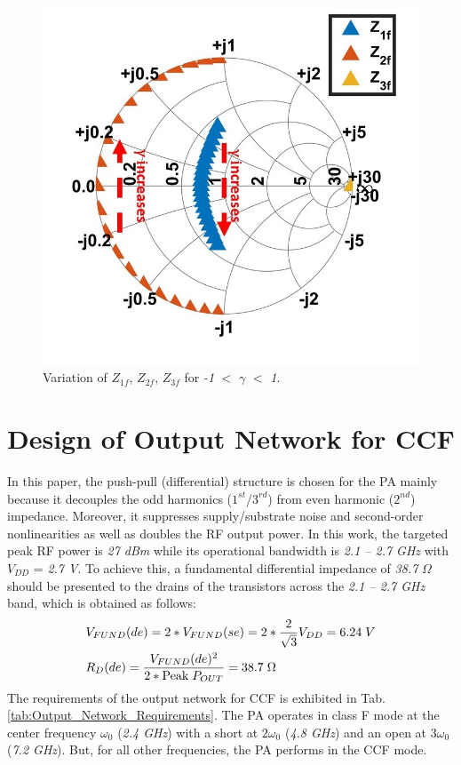 \documentclass[conference]{IEEEtran}
\begin{document}
\begin{figure}[!t]
\centering
\captionsetup{font=footnotesize}
\includegraphics[width=0.63\linewidth]{Images/CCF/CCF_SC.jpg}
\caption{Variation of $Z_{1f}$, $Z_{2f}$, $Z_{3f}$ for \textit{-1} $<$ $\gamma$ $<$ \textit{1}.}
\label{fig:CCF_SC}
\vspace{-0.05in}
\end{figure}
 

\section{Design of Output Network for CCF}
\label{section:ON}
In this paper, the \color{blue} push-pull (differential) \color{black} structure is chosen for the PA mainly because it \color{blue} decouples the odd harmonics ($1^{st}$/$3^{rd}$) from even harmonic ($2^{nd}$) impedance. \color{black} Moreover, it \color{blue} suppresses supply/substrate noise \color{black} and second-order nonlinearities as well as \color{blue} doubles the RF \color{black} output power. 
\color{blue} In this work, the targeted peak RF power is \textit{27 dBm}  while its operational bandwidth is \textit{2.1 -- 2.7 GHz} with $V_{DD}$ = \textit{2.7 V}. To \color{black} achieve this, a \color{blue} fundamental \color{black} differential impedance of \textit{38.7} $\Omega$ should be presented to the drains of the transistors across the  \color{blue}  \textit{2.1 -- 2.7 GHz} band, which is obtained as follows:\color{black}
\vspace{-0.05in}
\begin{equation}
\begin{aligned}
&V_{FUND}(de)=2*V_{FUND}(se)=2*\frac{2}{\sqrt{3}} V_{DD}=6.24 \hspace{1mm}V\\
&R_{D}(de)=\frac{V_{FUND}(de)^{2}}{2*\text{Peak} \hspace{1mm} P_{OUT}}=38.7 \hspace{1mm} \Omega
\label{eqn_diff_imp}
\end{aligned}
\end{equation}
The requirements of the output network for CCF is exhibited in Tab. \ref{tab:Output_Network_Requirements}. The PA operates in class F mode at the center frequency $\omega_0$ (\textit{2.4 GHz}) with a short at $2\omega_0$ (\textit{4.8 GHz}) and an open at $3\omega_0$ (\textit{7.2 GHz}). But, for all other frequencies, the PA performs in the CCF mode. 
\end{document}
